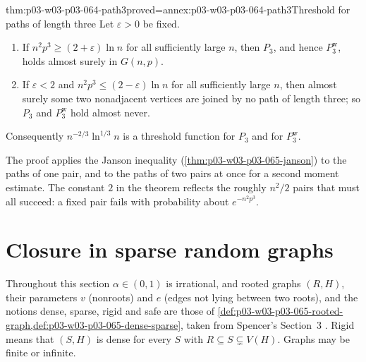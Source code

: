 \begin{hbtheorem}{thm:p03-w03-p03-064-path3}{proved=annex:p03-w03-p03-064-path3}{Threshold for paths of length three}
Let \(\varepsilon>0\) be fixed.
\begin{enumerate}
\item If \(n^2p^3\geq(2+\varepsilon)\ln n\) for all sufficiently large \(n\),
  then \(P_3\), and hence \(P_3^{\mathrm w}\), holds almost surely in
  \(G(n,p)\).
\item If \(\varepsilon<2\) and \(n^2p^3\leq(2-\varepsilon)\ln n\) for all
  sufficiently large \(n\), then almost surely some two nonadjacent vertices
  are joined by no path of length three; so \(P_3\) and
  \(P_3^{\mathrm w}\) hold almost never.
\end{enumerate}
Consequently \(n^{-2/3}\ln^{1/3}n\) is a threshold function for \(P_3\) and
for \(P_3^{\mathrm w}\).
\end{hbtheorem}

The proof applies the Janson inequality (\cref{thm:p03-w03-p03-065-janson})
to the paths of one pair, and to the paths of two pairs at once for a second
moment estimate.  The constant \(2\) in the theorem reflects the roughly
\(n^2/2\) pairs that must all succeed: a fixed pair fails with probability
about \(e^{-n^2p^3}\).

\section{Closure in sparse random graphs}
\label{sec:p03-w03-p03-064-closure}

Throughout this section \(\alpha\in(0,1)\) is irrational, and rooted graphs
\((R,H)\), their parameters \(v\) (nonroots) and \(e\) (edges not lying
between two roots), and the notions dense, sparse, rigid and safe are those
of \cref{def:p03-w03-p03-065-rooted-graph,def:p03-w03-p03-065-dense-sparse},
taken from Spencer's Section~3
\cite[p.~6]{Spencer2007LogicRandomStructuresAuthor}.  Rigid means that
\((S,H)\) is dense for every \(S\) with \(R\subseteq S\subsetneq V(H)\).
Graphs may be finite or infinite.

